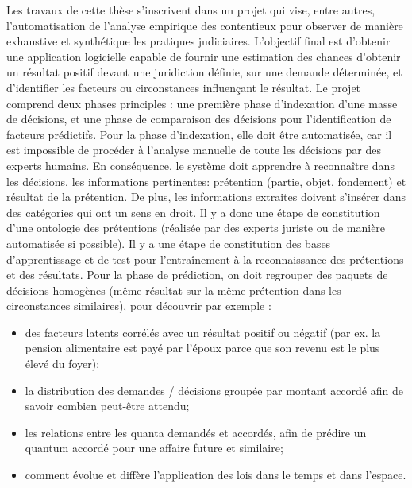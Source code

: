 Les travaux de cette thèse s'inscrivent dans un projet qui vise, entre autres, l'automatisation de l'analyse empirique des contentieux pour observer de manière exhaustive et synthétique les pratiques judiciaires. L'objectif final est d'obtenir une application logicielle capable de fournir une estimation des chances d'obtenir un résultat positif devant une juridiction définie, sur une demande déterminée, et d'identifier les facteurs ou circonstances influençant le résultat. Le projet comprend deux phases principles : une première phase d'indexation d'une masse de décisions, et une phase de comparaison des décisions pour l'identification de facteurs prédictifs. Pour la phase d'indexation, elle doit être automatisée, car il est impossible de procéder à l'analyse manuelle de toute les décisions par des experts humains. En conséquence, le système doit apprendre à reconnaître dans les décisions, les informations pertinentes: prétention (partie, objet, fondement) et résultat de la prétention. De plus, les informations extraites doivent s'insérer dans des catégories qui ont un sens en droit. Il y a donc une étape de constitution d'une ontologie des prétentions (réalisée par des experts juriste ou de manière automatisée si possible). Il y a une étape de constitution des bases d'apprentissage et de test pour l'entraînement à la reconnaissance des prétentions et des résultats.
Pour la phase de prédiction, on doit regrouper des paquets de décisions homogènes (même résultat sur la même prétention dans les circonstances similaires), pour découvrir par exemple : 
\begin{itemize}
    \item des facteurs latents corrélés avec un résultat positif ou négatif (par ex. la pension alimentaire est payé par l'époux parce que son revenu est le plus élevé du foyer);
    \item la distribution des demandes / décisions groupée par montant accordé afin de savoir combien peut-être attendu;
    \item les relations entre les quanta demandés et accordés, afin de prédire un quantum accordé pour une affaire future et similaire;
    \item comment évolue et diffère l'application des lois dans le temps et dans l'espace.
\end{itemize}

